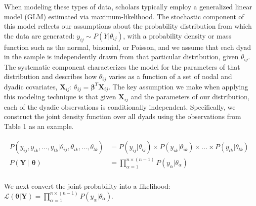 \documentclass[12pt,pdflatex]{elsarticle}
\begin{document}
When modeling these types of data, scholars typically employ a generalized linear model (GLM) estimated via maximum-likelihood. The stochastic component of this model reflects our assumptions about the probability distribution from which the data are generated: $y_{ij} \sim P(Y | \theta_{ij})$, with a probability density or mass function such as the normal, binomial, or Poisson, and we assume that each dyad in the sample is independently drawn from that particular distribution, given $\theta_{ij}$. The systematic component characterizes the model for the parameters of that distribution and describes how $\theta_{ij}$ varies as a function of a set of nodal and dyadic covariates, $\mathbf{X}_{ij}$: $\theta_{ij} = \bm\beta^{T} \mathbf{X}_{ij}$. The key assumption we make when applying this modeling technique is that given $\mathbf{X}_{ij}$ and the parameters of our distribution, each of the dyadic observations is conditionally independent. Specifically, we construct the joint density function over all dyads using the observations from Table 1 as an example.

\vspace{-8mm}
\begin{align}
\begin{aligned}
	P(y_{ij}, y_{ik}, \ldots, y_{lk} | \theta_{ij}, \theta_{ik}, \ldots, \theta_{lk}) &= P(y_{ij} | \theta_{ij}) \times P(y_{ik} | \theta_{ik}) \times \ldots \times P(y_{lk} | \theta_{lk}) \\
	P(\mathbf{Y} \; | \; \bm{\theta}) &= \prod_{\alpha=1}^{n \times (n-1)} P(y_{\alpha} | \theta_{\alpha})  \\
\end{aligned}
\end{align}

\noindent We next convert the joint probability into a likelihood: $\displaystyle \mathcal{L} (\bm{\theta} | \mathbf{Y}) = \prod_{\alpha=1}^{n \times (n-1)} P(y_{\alpha} | \theta_{\alpha})$.
\end{document}
